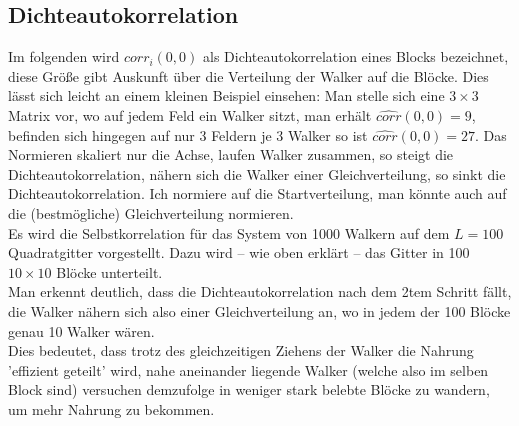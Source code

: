 \documentclass[a4paper, 12pt]{report}
\begin{document}
\subsection{Dichteautokorrelation}\label{Dichteautokorr}
\noindent Im folgenden wird $corr_i(0,0)$ als Dichteautokorrelation eines Blocks bezeichnet, diese Größe gibt Auskunft über die Verteilung der Walker auf die Blöcke. Dies lässt sich leicht an einem kleinen Beispiel einsehen: Man stelle sich eine $3\times 3$ Matrix vor, wo auf jedem Feld ein Walker sitzt, man erhält $\hat{corr}(0,0)=9$, befinden sich hingegen auf nur 3 Feldern je 3 Walker so ist $\hat{corr}(0,0)=27$. Das Normieren skaliert nur die Achse, laufen Walker zusammen, so steigt die Dichteautokorrelation, nähern sich die Walker einer Gleichverteilung, so sinkt die Dichteautokorrelation. Ich normiere auf die Startverteilung, man könnte auch auf die (bestmögliche) Gleichverteilung normieren.
\\
\noindent Es wird die Selbstkorrelation für das System von 1000 Walkern auf dem $L=100$ Quadratgitter vorgestellt. Dazu wird -- wie oben erklärt -- das Gitter in 100 $10\times 10$ Blöcke unterteilt.
\\
\noindent Man erkennt deutlich, dass die Dichteautokorrelation nach dem 2tem Schritt fällt, die Walker nähern sich also einer Gleichverteilung an, wo in jedem der 100 Blöcke genau 10 Walker wären.
\\
\noindent Dies bedeutet, dass trotz des gleichzeitigen Ziehens der Walker die Nahrung 'effizient geteilt' wird, nahe aneinander liegende Walker (welche also im selben Block sind) versuchen demzufolge in weniger stark belebte Blöcke zu wandern, um mehr Nahrung zu bekommen.
\end{document}
